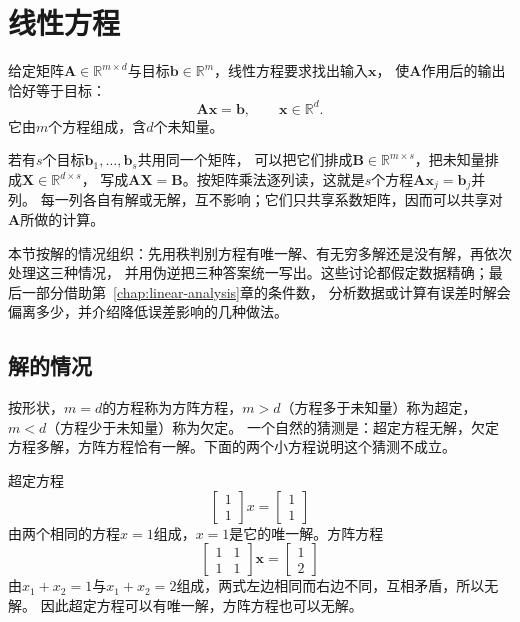 
\section{线性方程}
\label{sec:ls-exact-linear-equations}
\label{sec:linear-algebra-exact-systems}

给定矩阵$\bm A\in\mathbb R^{m\times d}$与目标$\bm b\in\mathbb R^m$，线性方程要求找出输入$\bm x$，
使$\bm A$作用后的输出恰好等于目标：
\begin{equation}
 \bm A\bm x=\bm b,\qquad \bm x\in\mathbb R^d.
 \label{eq:linear-algebra-linear-system}
\end{equation}
它由$m$个方程组成，含$d$个未知量。

若有$s$个目标$\bm b_1,\ldots,\bm b_s$共用同一个矩阵，
可以把它们排成$\bm B\in\mathbb R^{m\times s}$，把未知量排成$\bm X\in\mathbb R^{d\times s}$，
写成$\bm A\bm X=\bm B$。按矩阵乘法逐列读，这就是$s$个方程$\bm A\bm x_j=\bm b_j$并列。
每一列各自有解或无解，互不影响；它们只共享系数矩阵，因而可以共享对$\bm A$所做的计算。

本节按解的情况组织：先用秩判别方程有唯一解、有无穷多解还是没有解，再依次处理这三种情况，
并用伪逆把三种答案统一写出。这些讨论都假定数据精确；最后一部分借助第~\ref{chap:linear-analysis}章的条件数，
分析数据或计算有误差时解会偏离多少，并介绍降低误差影响的几种做法。

\subsection{解的情况}
\label{sec:ls-solution-cases}

按形状，$m=d$的方程称为方阵方程，$m>d$（方程多于未知量）称为超定，$m<d$（方程少于未知量）称为欠定。
一个自然的猜测是：超定方程无解，欠定方程多解，方阵方程恰有一解。下面的两个小方程说明这个猜测不成立。

\begin{example}[反例：形状不决定解的情况]
\label{ex:ls-shape-not-decisive}
超定方程
\[
 \begin{bmatrix}1\\1\end{bmatrix}x=\begin{bmatrix}1\\1\end{bmatrix}
\]
由两个相同的方程$x=1$组成，$x=1$是它的唯一解。方阵方程
\[
 \begin{bmatrix}1&1\\1&1\end{bmatrix}\bm x=\begin{bmatrix}1\\2\end{bmatrix}
\]
由$x_1+x_2=1$与$x_1+x_2=2$组成，两式左边相同而右边不同，互相矛盾，所以无解。
因此超定方程可以有唯一解，方阵方程也可以无解。
\end{example}

